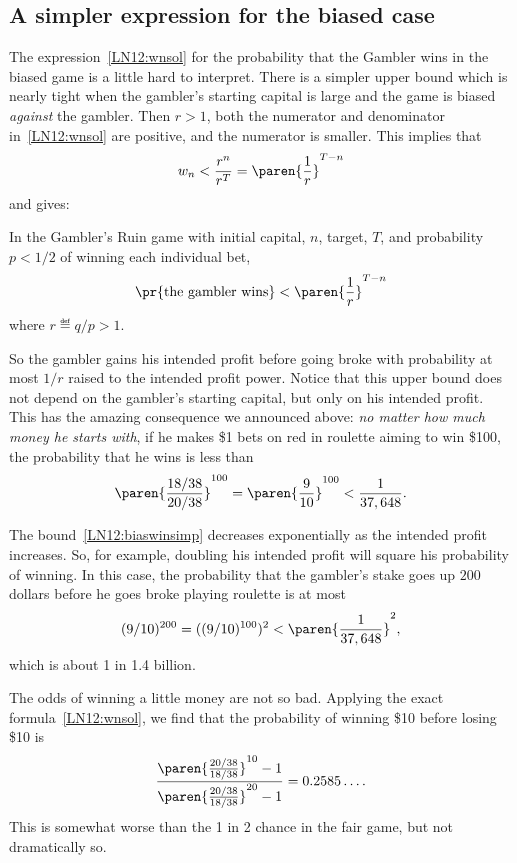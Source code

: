 \subsection{A simpler expression for the biased case}
The expression~\eqref{LN12:wnsol} for the probability that the Gambler
wins in the biased game is a little hard to interpret.  There is a
simpler upper bound which is nearly tight when the gambler's starting
capital is large and the game is biased \emph{against} the gambler.
Then $r >1$, both the numerator and denominator
in~\eqref{LN12:wnsol} are positive, and the numerator is smaller.
This implies that
\[
w_n < \frac{r^n}{r^T} = \paren{\frac{1}{r}}^{T-n}
\]
and gives:
\begin{corollary}\label{LN12:biaswincor}
  In the Gambler's Ruin game with initial capital, $n$, target, $T$,
  and probability $p < 1/2$ of winning each individual bet,
\begin{equation}\label{LN12:biaswinsimp}
\pr{\text{the gambler wins}} <  \paren{\frac{1}{r}}^{T-n} %
\end{equation}
where $r \eqdef q/p > 1$.
\end{corollary}

So the gambler gains his intended profit before going broke with
probability at most $1/r$ raised to the intended profit power.
Notice that this upper bound does not depend on the gambler's starting
capital, but only on his intended profit.  This has the amazing
consequence we announced above: \emph{no matter how much money he
  starts with}, if he makes \$1 bets on red in roulette aiming to win
\$100, the probability that he wins is less than
\[
\paren{\frac{18/38}{20/38}}^{100} = \paren{\frac{9}{10}}^{100} < \frac{1}{37,648}.
\]

The bound~\eqref{LN12:biaswinsimp} decreases exponentially as the
intended profit increases.  So, for example, doubling his intended
profit will square his probability of winning.  In this case, the
probability that the gambler's stake goes up $200$ dollars before he
goes broke playing roulette is at most
\[
(9/10)^{200} = ((9/10)^{100})^2 < \paren{\frac{1}{37,648}}^2,
\]
which is about 1 in 1.4 billion.

\begin{editingnotes}

The odds of winning a little money are not so bad.
Applying the exact formula~\eqref{LN12:wnsol}, we find that the probability
of winning \$10 before losing \$10 is
\[
\frac{\paren{\frac{20/38}{18/38}}^{10} - 1}
              {\paren{\frac{20/38}{18/38}}^{20} - 1}
  = 0.2585\dots.
\]
This is somewhat worse than the 1 in 2 chance in the fair game, but not
dramatically so.

\end{editingnotes}


